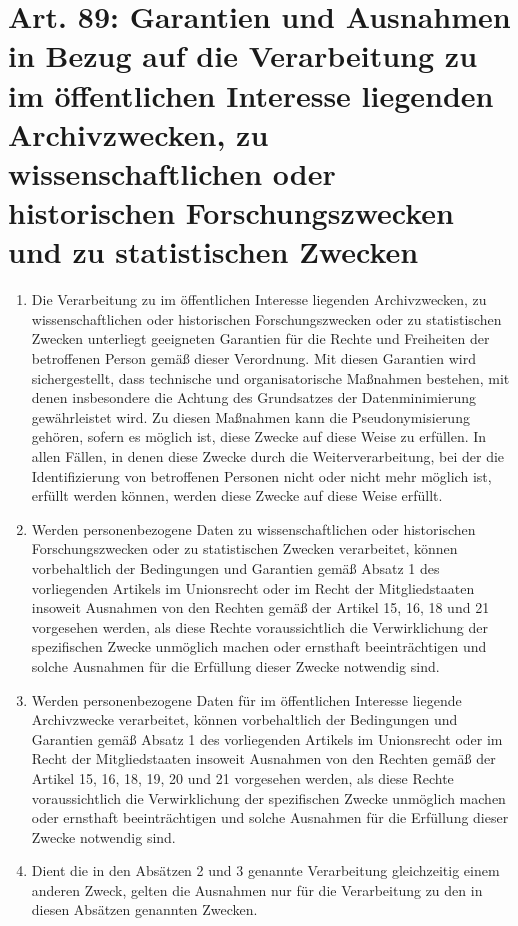     \section[Art. 89: Garantien]{Art. 89: Garantien und Ausnahmen in Bezug auf die Verarbeitung zu im öffentlichen Interesse liegenden Archivzwecken, zu wissenschaftlichen oder historischen Forschungszwecken und zu statistischen Zwecken}
        \begin{enumerate}[label=(\arabic*)]
            \item Die Verarbeitung zu im öffentlichen Interesse liegenden Archivzwecken, zu wissenschaftlichen oder historischen Forschungszwecken oder zu statistischen Zwecken unterliegt geeigneten Garantien für die Rechte und Freiheiten der betroffenen Person gemäß dieser Verordnung. Mit diesen Garantien wird sichergestellt, dass technische und organisatorische Maßnahmen bestehen, mit denen insbesondere die Achtung des Grundsatzes der Datenminimierung gewährleistet wird. Zu diesen Maßnahmen kann die Pseudonymisierung gehören, sofern es möglich ist, diese Zwecke auf diese Weise zu erfüllen. In allen Fällen, in denen diese Zwecke durch die Weiterverarbeitung, bei der die Identifizierung von betroffenen Personen nicht oder nicht mehr möglich ist, erfüllt werden können, werden diese Zwecke auf diese Weise erfüllt.
            \item Werden personenbezogene Daten zu wissenschaftlichen oder historischen Forschungszwecken oder zu statistischen Zwecken verarbeitet, können vorbehaltlich der Bedingungen und Garantien gemäß Absatz 1 des vorliegenden Artikels im Unionsrecht oder im Recht der Mitgliedstaaten insoweit Ausnahmen von den Rechten gemäß der Artikel 15, 16, 18 und 21 vorgesehen werden, als diese Rechte voraussichtlich die Verwirklichung der spezifischen Zwecke unmöglich machen oder ernsthaft beeinträchtigen und solche Ausnahmen für die Erfüllung dieser Zwecke notwendig sind.
            \item Werden personenbezogene Daten für im öffentlichen Interesse liegende Archivzwecke verarbeitet, können vorbehaltlich der Bedingungen und Garantien gemäß Absatz 1 des vorliegenden Artikels im Unionsrecht oder im Recht der Mitgliedstaaten insoweit Ausnahmen von den Rechten gemäß der Artikel 15, 16, 18, 19, 20 und 21 vorgesehen werden, als diese Rechte voraussichtlich die Verwirklichung der spezifischen Zwecke unmöglich machen oder ernsthaft beeinträchtigen und solche Ausnahmen für die Erfüllung dieser Zwecke notwendig sind. 
            \item Dient die in den Absätzen 2 und 3 genannte Verarbeitung gleichzeitig einem anderen Zweck, gelten die Ausnahmen nur für die Verarbeitung zu den in diesen Absätzen genannten Zwecken. 
        \end{enumerate}